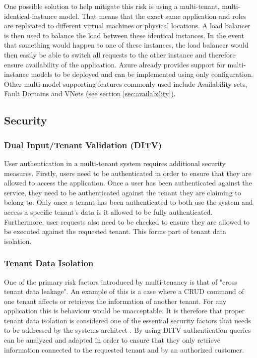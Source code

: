 One possible solution to help mitigate this risk is using a multi-tenant, multi-identical-instance model. That means that the exact same application and roles are replicated to different virtual machines or physical locations. A load balancer is then used to balance the load between these identical instances. In the event that something would happen to one of these instances, the load balancer would then easily be able to switch all requests to the other instance and therefore ensure availability of the application. Azure already provides support for multi-instance models to be deployed and can be implemented using only configuration. Other multi-model supporting features commonly used include Availability sets, Fault Domains and VNets (see section \ref{sec:availability}).


\subsection{Security}
\label{sec:security} 

\subsubsection{\textbf{Dual Input/Tenant Validation (DITV)}}
\label{sec:ditv}
User authentication in a multi-tenant system requires additional security measures. Firstly, users need to be authenticated in order to ensure that they are allowed to access the application. Once a user has been authenticated against the service, they need to be authenticated against the tenant they are claiming to belong to. Only once a tenant has been authenticated to both use the system and access a specific tenant's data is it allowed to be fully authenticated. Furthermore, user requests also need to be checked to ensure they are allowed to be executed against the requested tenant. This forms part of tenant data isolation.


\subsubsection{\textbf{Tenant Data Isolation}}
One of the primary risk factors introduced by multi-tenancy is that of "cross tenant data leakage". An example of this is a case where a CRUD command of one tenant affects or retrieves the information of another tenant. For any application this is behaviour would be unacceptable. It is therefore that proper tenant data isolation is considered one of the essential security factors that needs to be addressed by the systems architect \cite{Wilder2012-so}. By using DITV authentication queries can be analyzed and adapted in order to ensure that they only retrieve information connected to the requested tenant and by an authorized customer.


